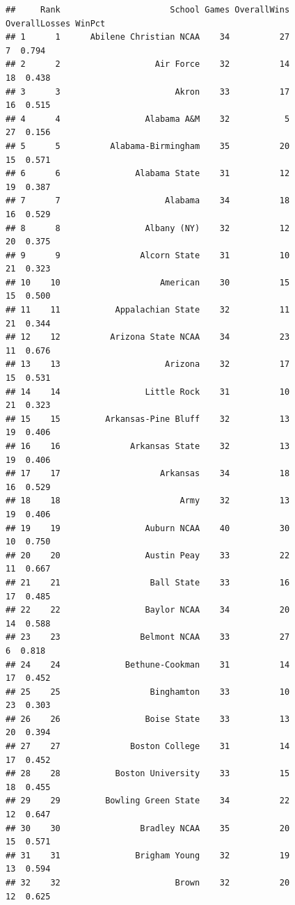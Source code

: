 \documentclass[]{book}
\begin{document}
\begin{verbatim}
##     Rank                      School Games OverallWins OverallLosses WinPct
## 1      1      Abilene Christian NCAA    34          27             7  0.794
## 2      2                   Air Force    32          14            18  0.438
## 3      3                       Akron    33          17            16  0.515
## 4      4                 Alabama A&M    32           5            27  0.156
## 5      5          Alabama-Birmingham    35          20            15  0.571
## 6      6               Alabama State    31          12            19  0.387
## 7      7                     Alabama    34          18            16  0.529
## 8      8                 Albany (NY)    32          12            20  0.375
## 9      9                Alcorn State    31          10            21  0.323
## 10    10                    American    30          15            15  0.500
## 11    11           Appalachian State    32          11            21  0.344
## 12    12          Arizona State NCAA    34          23            11  0.676
## 13    13                     Arizona    32          17            15  0.531
## 14    14                 Little Rock    31          10            21  0.323
## 15    15         Arkansas-Pine Bluff    32          13            19  0.406
## 16    16              Arkansas State    32          13            19  0.406
## 17    17                    Arkansas    34          18            16  0.529
## 18    18                        Army    32          13            19  0.406
## 19    19                 Auburn NCAA    40          30            10  0.750
## 20    20                 Austin Peay    33          22            11  0.667
## 21    21                  Ball State    33          16            17  0.485
## 22    22                 Baylor NCAA    34          20            14  0.588
## 23    23                Belmont NCAA    33          27             6  0.818
## 24    24             Bethune-Cookman    31          14            17  0.452
## 25    25                  Binghamton    33          10            23  0.303
## 26    26                 Boise State    33          13            20  0.394
## 27    27              Boston College    31          14            17  0.452
## 28    28           Boston University    33          15            18  0.455
## 29    29         Bowling Green State    34          22            12  0.647
## 30    30                Bradley NCAA    35          20            15  0.571
## 31    31               Brigham Young    32          19            13  0.594
## 32    32                       Brown    32          20            12  0.625

\end{verbatim}
\end{document}
